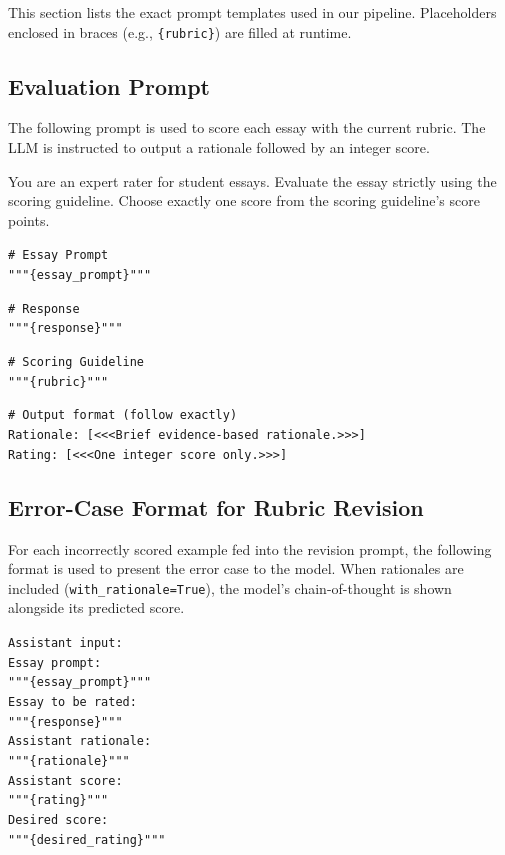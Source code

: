 \documentclass[11pt]{article}
\begin{document}
This section lists the exact prompt templates used in our pipeline. Placeholders enclosed in braces (e.g., \texttt{\{rubric\}}) are filled at runtime.

\subsection{Evaluation Prompt}
\label{sec:eval_prompt}
The following prompt is used to score each essay with the current rubric. The LLM is instructed to output a rationale followed by an integer score.

\begin{tcolorbox}[colback=white, colframe=RoyalBlue, title=Evaluation Prompt, fonttitle=\bfseries\small, fontupper=\small, breakable]
You are an expert rater for student essays.
Evaluate the essay strictly using the scoring guideline. Choose exactly one score from the scoring guideline's score points.

\texttt{\# Essay Prompt}\\
\texttt{"""\{essay\_prompt\}"""}

\texttt{\# Response}\\
\texttt{"""\{response\}"""}

\texttt{\# Scoring Guideline}\\
\texttt{"""\{rubric\}"""}

\texttt{\# Output format (follow exactly)}\\
\texttt{Rationale: [<<<Brief evidence-based rationale.>>>]}\\
\texttt{Rating: [<<<One integer score only.>>>]}
\end{tcolorbox}

\subsection{Error-Case Format for Rubric Revision}
\label{sec:error_format}
For each incorrectly scored example fed into the revision prompt, the following format is used to present the error case to the model. When rationales are included (\texttt{with\_rationale=True}), the model's chain-of-thought is shown alongside its predicted score.

\begin{tcolorbox}[colback=white, colframe=RoyalBlue, title=Error-Case Format (with rationale), fonttitle=\bfseries\small, fontupper=\small, breakable]
\texttt{Assistant input:}\\
\texttt{Essay prompt:}\\
\texttt{"""\{essay\_prompt\}"""}\\
\texttt{Essay to be rated:}\\
\texttt{"""\{response\}"""}\\
\texttt{Assistant rationale:}\\
\texttt{"""\{rationale\}"""}\\
\texttt{Assistant score:}\\
\texttt{"""\{rating\}"""}\\
\texttt{Desired score:}\\
\texttt{"""\{desired\_rating\}"""}
\end{tcolorbox}
\end{document}
